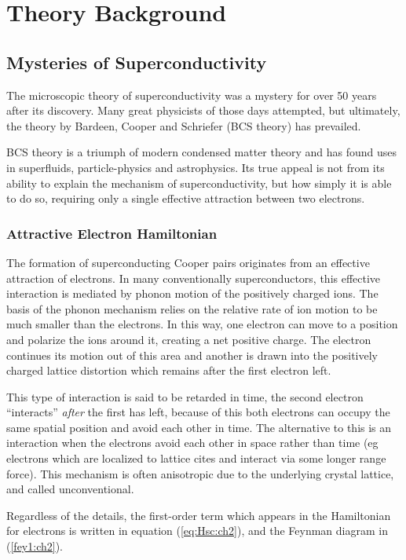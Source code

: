 \chapter{\label{ch:2}Theory Background}

\section{\label{ch:2.1}Mysteries of Superconductivity}
The microscopic theory of superconductivity was a mystery for over 50 years after its discovery. Many great physicists of those days attempted, but ultimately, the theory by Bardeen, Cooper and Schriefer (BCS theory) has prevailed.

BCS theory is a triumph of modern condensed matter theory and has found uses in superfluids, particle-physics and astrophysics. Its true appeal is not from  its ability to explain the mechanism of superconductivity, but how simply it is able to do so, requiring only a single effective attraction between two electrons.

\subsection{\label{ch:2.1.1}Attractive Electron Hamiltonian}
The formation of superconducting Cooper pairs originates from an effective attraction of electrons. In many conventionally superconductors, this effective interaction is mediated by phonon motion of the positively charged ions. The basis of the phonon mechanism relies on the relative rate of ion motion to be much smaller than the electrons. In this way, one electron can move to a position and polarize the ions around it, creating a net positive charge. The electron continues its motion out of this area and another is drawn into the positively charged lattice distortion which remains after the first electron left.

This type of interaction is said to be retarded in time, the second electron ``interacts'' \emph{after} the first has left, because of this both electrons can occupy the same spatial position and avoid each other in time. The alternative to this is an interaction when the electrons avoid each other in space rather than time (eg electrons which are localized to lattice cites and interact via some longer range force). This mechanism is often anisotropic due to the underlying crystal lattice, and called unconventional.

Regardless of the details, the first-order term which appears in the Hamiltonian for electrons is written in equation (\ref{eq:Hsc:ch2}), and the Feynman diagram in (\ref{fey1:ch2}).

